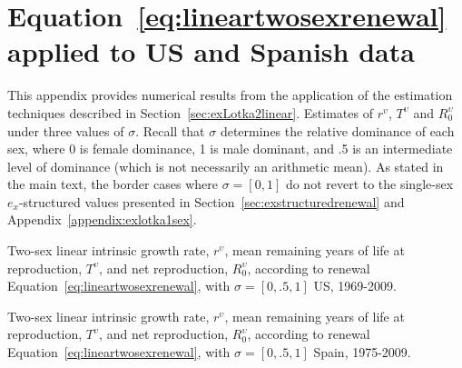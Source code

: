 \chapter{Equation~\ref{eq:lineartwosexrenewal} applied to US and Spanish data}
This appendix provides numerical results from the application of the
estimation techniques described in Section~\ref{sec:exLotka2linear}. Estimates
of $r^\upsilon$, $T^\upsilon$ and $R_0^\upsilon$ under three values of $\sigma$.
Recall that $\sigma$ determines the relative dominance of each sex, where 0 is
female dominance, 1 is male dominant, and .5 is an intermediate level of
dominance (which is not necessarily an arithmetic mean). As stated in the
main text, the border cases where $\sigma = [0,1]$ do not revert to the
single-sex $e_x$-structured values presented in Section~\ref{sec:exstructuredrenewal} and
Appendix~\ref{appendix:exlotka1sex}.

\begin{table}
  \begin{adjustwidth}{-1in}{-.5in}
  \centering
    \caption{Two-sex linear intrinsic growth rate, $r^\upsilon$, mean remaining
years of life at reproduction, $T^\upsilon$, and net reproduction,
$R_0^\upsilon$, according to renewal Equation~\eqref{eq:lineartwosexrenewal},
with $\sigma = [0, .5, 1]$ US, 1969-2009.}
    \label{tab:ex2linRepES}
        
  \end{adjustwidth}
\end{table}

\begin{table}
  \begin{adjustwidth}{-1in}{-.5in}
    \centering
    \caption{Two-sex linear intrinsic growth rate, $r^\upsilon$, mean remaining
years of life at reproduction, $T^\upsilon$, and net reproduction,
$R_0^\upsilon$, according to renewal Equation~\eqref{eq:lineartwosexrenewal}, with
$\sigma = [0, .5, 1]$ Spain, 1975-2009.}
    \label{tab:ex2linRepES}
        
  \end{adjustwidth}
\end{table}



